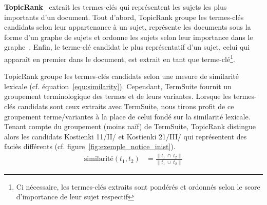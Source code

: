     \textbf{TopicRank}~\cite{bougouin2013topicrank} extrait les termes-clés qui
    représentent les sujets les plus importants d'un document. Tout d'abord,
    TopicRank groupe les termes-clés candidats selon leur appartenance à un
    sujet, représente les documents sous la forme d'un graphe de sujets et
    ordonne les sujets selon leur importance dans le
    graphe~\cite{mihalcea2004textrank}. Enfin, le terme-clé candidat le plus
    représentatif d'un sujet, celui qui apparaît en premier dans le document,
    est extrait en tant que terme-clé\footnote{Ci nécessaire, les termes-clés
    extraits sont pondérés et ordonnés selon le score d'importance de leur sujet
    respectif}.
    
    TopicRank groupe les termes-clés candidats selon une mesure de similarité
    lexicale (cf. équation~\ref{equ:similarity}). Cependant, TermSuite fournit
    un groupement terminologique des termes et de leurs variantes. Lorsque les
    termes-clés candidats sont ceux extraits avec TermSuite, nous tirons profit
    de ce groupement terme/variantes à la place de celui fondé sur la similarité
    lexicale. Tenant compte du groupement (moins naïf) de TermSuite, TopicRank
    distingue alors les candidats \og{}Kostienki 11/II/\fg{} et \og{}Kostienki
    21/III/\fg{} qui représentent des faciès différents (cf.
    figure~\ref{fig:exemple_notice_inist}).
    \begin{align}
      \text{similarité}(t_1, t_2) &= \frac{\|t_1~\cap~t_2\|}{\|t_1~\cup~t_2\|} \label{equ:similarity}
    \end{align}

